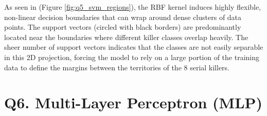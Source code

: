 \documentclass{article}
\begin{document}
\begin{itemize}
As seen in (Figure \ref{fig:q5_svm_regions}), the RBF kernel induces highly flexible, non-linear decision boundaries that can wrap around dense clusters of data points. The support vectors (circled with black borders) are predominantly located near the boundaries where different killer classes overlap heavily. The sheer number of support vectors indicates that the classes are not easily separable in this 2D projection, forcing the model to rely on a large portion of the training data to define the margins between the territories of the 8 serial killers.

\end{itemize}

\section*{Q6. Multi-Layer Perceptron (MLP)}
\end{document}
